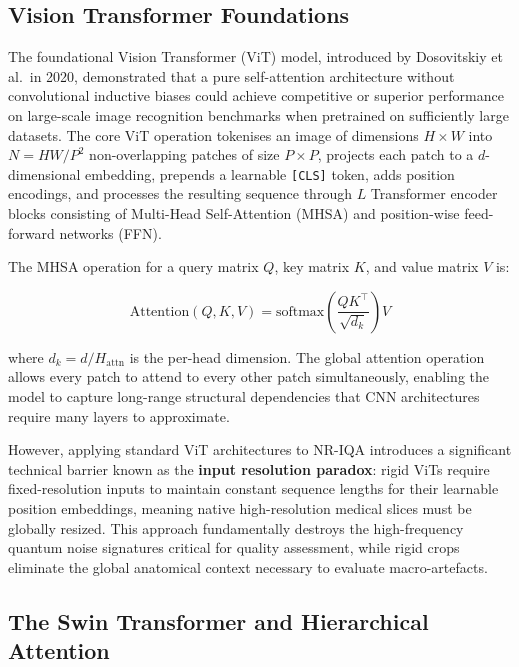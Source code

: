 \subsection{Vision Transformer Foundations}
\label{subsec:vit_foundations}

The foundational Vision Transformer (ViT) model, introduced by Dosovitskiy et al.\ in
2020, demonstrated that a pure self-attention architecture without convolutional inductive
biases could achieve competitive or superior performance on large-scale image recognition
benchmarks when pretrained on sufficiently large datasets. The core ViT operation
tokenises an image of dimensions $H \times W$ into $N = HW/P^2$ non-overlapping patches
of size $P \times P$, projects each patch to a $d$-dimensional embedding, prepends a
learnable \texttt{[CLS]} token, adds position encodings, and processes the resulting
sequence through $L$ Transformer encoder blocks consisting of Multi-Head Self-Attention
(MHSA) and position-wise feed-forward networks (FFN).

The MHSA operation for a query matrix $Q$, key matrix $K$, and value matrix $V$ is:

\begin{equation}
    \text{Attention}(Q, K, V) = \text{softmax}\!\left(\frac{QK^\top}{\sqrt{d_k}}\right) V
\end{equation}

where $d_k = d / H_{\text{attn}}$ is the per-head dimension. The global attention operation
allows every patch to attend to every other patch simultaneously, enabling the model to
capture long-range structural dependencies that CNN architectures require many layers to
approximate.

However, applying standard ViT architectures to NR-IQA introduces a significant technical
barrier known as the \textbf{input resolution paradox}: rigid ViTs require fixed-resolution
inputs to maintain constant sequence lengths for their learnable position embeddings,
meaning native high-resolution medical slices must be globally resized. This approach
fundamentally destroys the high-frequency quantum noise signatures critical for quality
assessment, while rigid crops eliminate the global anatomical context necessary to evaluate
macro-artefacts.

\subsection{The Swin Transformer and Hierarchical Attention}
\label{subsec:swin}

